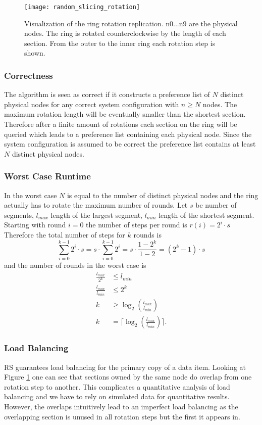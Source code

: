 \begin{figure}
\texttt{[image: random\_slicing\_rotation]}
\caption[Visualization of the ring rotation replication]{Visualization of the ring rotation replication.
n0...n9 are the physical nodes.
The ring is rotated counterclockwise by the length of each section.
From the outer to the inner ring each rotation step is shown.
}
\label{fig:ring_rotation}
\end{figure}

\subsubsection{Correctness}
The algorithm is seen as correct if it constructs a preference list of $N$ distinct physical nodes for any correct system configuration with $n\geq N$ nodes.
The maximum rotation length will be eventually smaller than the shortest section.
Therefore after a finite amount of rotations each section on the ring will be queried which leads to a preference list containing each physical node.
Since the system configuration is assumed to be correct the preference list contains at least $N$ distinct physical nodes.

\subsubsection{Worst Case Runtime}
In the worst case $N$ is equal to the number of distinct physical nodes and the ring actually has to rotate the maximum number of rounds.
 Let $s$ be number of segments, $l_{max}$ length of the largest segment, $l_{min}$ length of the shortest segment.
Starting with round $i=0$ the number of steps per round is $r(i) = 2^i\cdot s$
Therefore the total number of steps for $k$ rounds is
\[
\sum\limits_{i=0}^{k-1}2^i\cdot s = s\cdot \sum\limits_{i=0}^{k-1}2^i = s\cdot\frac{1-2^k}{1-2} = (2^k - 1)\cdot s
\]
and the number of rounds in the worst case is
\begin{align*}
\frac{l_{max}}{2^k} &\leq l_{min}\\
\frac{l_{max}}{l_{min}} &\leq 2^k\\
k &\geq \log_2(\frac{l_{max}}{l_{min}})\\
k &= \lceil \log_2(\frac{l_{max}}{l_{min}}) \rceil.
\end{align*}

\subsubsection{Load Balancing}
\ac{RS} guarantees load balancing for the primary copy of a data item.
Looking at Figure \ref{fig:ring_rotation} one can see that sections owned by the same node do overlap from one rotation step to another.
This complicates a quantitative analysis of load balancing and we have to rely on simulated data for quantitative results.
However, the overlaps intuitively lead to an imperfect load balancing as the overlapping section is unused in all rotation steps but the first it appears in.

